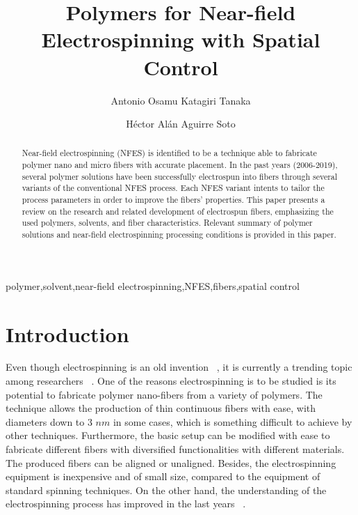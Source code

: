 \documentclass[5p,,preprint,12pt,twocolumn]{elsarticle}
\begin{document}
\begin{frontmatter}
	
\title{Polymers for Near-field Electrospinning with Spatial Control
}
    
\author[]{Antonio Osamu Katagiri Tanaka}
\author[]{H{\'e}ctor Al\'{a}n Aguirre Soto}
    

\begin{abstract}
Near-field electrospinning (NFES) is identified to be a technique able to fabricate polymer nano and micro fibers with accurate placement. In the past years (2006-2019), several polymer solutions have been successfully electrospun into fibers through several variants of the conventional NFES process. Each NFES variant intents to tailor the process parameters in order to improve the fibers' properties. This paper presents a review on the research and related development of electrospun fibers, emphasizing the used polymers, solvents, and fiber characteristics. Relevant summary of polymer solutions and near-field electrospinning processing conditions is provided in this paper.
\end{abstract}
\begin{keyword} 
      polymer\sep solvent\sep near-field electrospinning\sep NFES\sep fibers\sep spatial control
\end{keyword}
      
\end{frontmatter}
\tableofcontents

    
\section{Introduction}
Even though electrospinning is an old invention \unskip~\cite{527120:12073288}, it is currently a trending topic among researchers \unskip~\cite{527120:12073453,527120:12073495,527120:12073496}. One of the reasons electrospinning is to be studied is its potential to fabricate polymer nano-fibers from a variety of polymers. The technique allows the production of thin continuous fibers with ease, with diameters down to 3 $nm $ in some cases, which is something difficult to achieve by other techniques. Furthermore, the basic setup can be modified with ease to fabricate different fibers with diversified functionalities with different materials. The produced fibers can be aligned or unaligned. Besides, the electrospinning equipment is inexpensive and of small size, compared to the equipment of standard spinning techniques. On the other hand, the understanding of the electrospinning process has improved in the last years \unskip~\cite{527120:12073538}.
\end{document}
